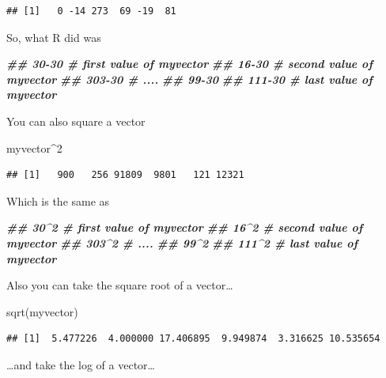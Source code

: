 \documentclass[
]{book}
\newenvironment{Shaded}{\begin{snugshade}}{\end{snugshade}}
\newcommand{\DecValTok}[1]{\textcolor[rgb]{0.00,0.00,0.81}{#1}}
\newcommand{\DocumentationTok}[1]{\textcolor[rgb]{0.56,0.35,0.01}{\textbf{\textit{#1}}}}
\newcommand{\FunctionTok}[1]{\textcolor[rgb]{0.00,0.00,0.00}{#1}}
\newcommand{\NormalTok}[1]{#1}
\newcommand{\SpecialCharTok}[1]{\textcolor[rgb]{0.00,0.00,0.00}{#1}}
\begin{document}
\begin{verbatim}
## [1]   0 -14 273  69 -19  81
\end{verbatim}

So, what R did was

\begin{Shaded}
\begin{Highlighting}[]
\DocumentationTok{\#\# 30{-}30    \# first value of myvector}
\DocumentationTok{\#\# 16{-}30    \# second value of myvector}
\DocumentationTok{\#\# 303{-}30   \# ....}
\DocumentationTok{\#\# 99{-}30}
\DocumentationTok{\#\# 111{-}30   \# last value of myvector}
\end{Highlighting}
\end{Shaded}

You can also square a vector

\begin{Shaded}
\begin{Highlighting}[]
\NormalTok{myvector}\SpecialCharTok{\^{}}\DecValTok{2}
\end{Highlighting}
\end{Shaded}

\begin{verbatim}
## [1]   900   256 91809  9801   121 12321
\end{verbatim}

Which is the same as

\begin{Shaded}
\begin{Highlighting}[]
\DocumentationTok{\#\# 30\^{}2    \# first value of myvector}
\DocumentationTok{\#\# 16\^{}2    \# second value of myvector}
\DocumentationTok{\#\# 303\^{}2   \# ....}
\DocumentationTok{\#\# 99\^{}2}
\DocumentationTok{\#\# 111\^{}2   \# last value of myvector}
\end{Highlighting}
\end{Shaded}

Also you can take the square root of a vector\ldots{}

\begin{Shaded}
\begin{Highlighting}[]
\FunctionTok{sqrt}\NormalTok{(myvector)}
\end{Highlighting}
\end{Shaded}

\begin{verbatim}
## [1]  5.477226  4.000000 17.406895  9.949874  3.316625 10.535654
\end{verbatim}

\ldots and take the log of a vector\ldots{}
\end{document}
